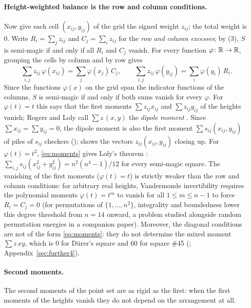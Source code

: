 \paragraph{Height-weighted balance is the row and column conditions.}
Now give each cell $(x_{ij},y_{ij})$ of the grid the signed weight $z_{ij}$; the total weight is $0$.
Write $R_i=\sum_jz_{ij}$ and $C_j=\sum_iz_{ij}$ for the \emph{row and column excesses}; by (3), $S$ is semi-magic if and only if all $R_i$ and $C_j$ vanish.
For every function $\varphi\colon\mathbb{R}\to\mathbb{R}$, grouping the cells by column and by row gives
\begin{equation}
\sum_{i,j}z_{ij}\,\varphi(x_{ij})=\sum_j\varphi(x_j)\,C_j,\qquad
\sum_{i,j}z_{ij}\,\varphi(y_{ij})=\sum_i\varphi(y_i)\,R_i .
\label{eq:moments}
\end{equation}
Since the functions $\varphi(x)$ on the grid span the indicator functions of the columns, $S$ is semi-magic if and only if both sums vanish for every $\varphi$.
For $\varphi(t)=t$ this says that the first moments $\sum z_{ij}x_{ij}$ and $\sum z_{ij}y_{ij}$ of the heights vanish; Rogers and Loly call $\sum z\,(x,y)$ the \emph{dipole moment} \cite{rogers2005multipole}.
Since $\sum x_{ij}=\sum y_{ij}=0$, the dipole moment is also the first moment $\sum s_{ij}(x_{ij},y_{ij})$ of piles of $s_{ij}$ checkers ();  shows the vectors $z_{ij}(x_{ij},y_{ij})$ closing up.
For $\varphi(t)=t^2$, \eqref{eq:moments} gives Loly's theorem \cite{loly2004invariance}: $\sum_{i,j}s_{ij}(x_{ij}^2+y_{ij}^2)=n^2(n^4-1)/12$ for every semi-magic square.
The vanishing of the first moments ($\varphi(t)=t$) is strictly weaker than the row and column conditions: for arbitrary real heights, Vandermonde invertibility requires the polynomial moments $\varphi(t)=t^m$ to vanish for all $1\le m\le n-1$ to force $R_i=C_j=0$ (for permutations of $\{1,\dots,n^2\}$, integrality and boundedness lower this degree threshold from $n=14$ onward, a problem studied alongside random permutation energies in a companion paper).
Moreover, the diagonal conditions are not of the form \eqref{eq:moments}: they do not determine the mixed moment $\sum z\,xy$, which is $0$ for D\"urer's square and $60$ for square \#45 (; Appendix~\ref{sec:further4}).

\paragraph{Second moments.}
The second moments of the point set are as rigid as the first: when the first moments of the heights vanish they do not depend on the arrangement at all.

